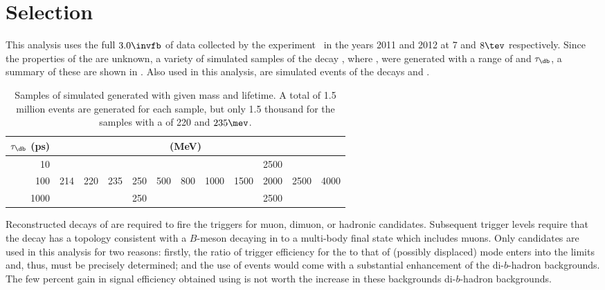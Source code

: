 \section{Selection}

This analysis uses the full $3.0\invfb$ of data collected by the \lhcb
experiment~ in the years 2011 and 2012 at 7 and $8\tev$ respectively.
Since the properties of the \db are unknown, a variety of simulated samples of the decay \btokstrdb,
where \dbtomumu, were generated with a range of \mass{\db} and $\tau_\db$, a summary of these are
shown in .
Also used in this analysis, are simulated events of the decays \btokstrmumu and \btojpsikstr.

\begin{table}
  \caption[Samples of simulated \btokstrdb generated for the analysis]{
    Samples of simulated \btokstrdb generated with given mass and lifetime.
    A total of 1.5 million events are generated for each sample, but only 1.5 thousand for the
    samples with a \mass{\db} of 220 and $235\mev$.
  }
  \label{tab:db:samples}
  \begin{center}
    \begin{tabular}{rccccccccccc}\toprule
      $\tau_\db$ (ps) & \multicolumn{10}{c}{\mass{\db} (MeV)} \\\midrule
      10 &&&&&&&&&2500 \\
      100 &214&220&235&250&500&800&1000&1500&2000&2500&4000 \\
      1000 &&&&250&&&&&2500 \\
      \bottomrule
    \end{tabular}
  \end{center}
\end{table}

Reconstructed decays of \btokstrdb are required to fire the \lone triggers for muon, dimuon, or
hadronic candidates.
Subsequent trigger levels require that the decay has a topology consistent with a $B$-meson
decaying in to a multi-body final state which includes muons.
Only \TOS candidates are used in this analysis for two reasons: firstly, the ratio of trigger
efficiency for the \sm \btokstrmumu to that of (possibly displaced) \db mode enters
into the limits and, thus, must be precisely determined; and the use of \TIS events would
come with a substantial enhancement of the di-$b$-hadron backgrounds.
The few percent gain in signal efficiency obtained using \TIS is not worth the increase in these
backgrounds  di-$b$-hadron backgrounds.

